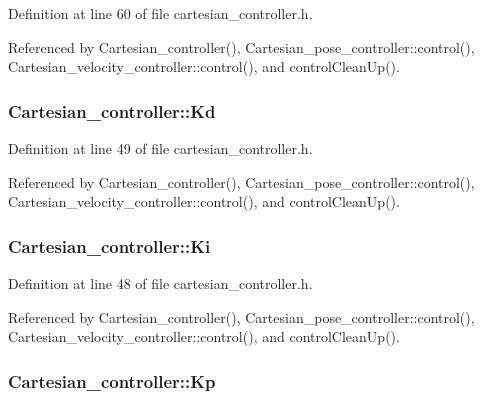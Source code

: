 Definition at line 60 of file cartesian\-\_\-controller.\-h.



Referenced by Cartesian\-\_\-controller(), Cartesian\-\_\-pose\-\_\-controller\-::control(), Cartesian\-\_\-velocity\-\_\-controller\-::control(), and control\-Clean\-Up().

\hypertarget{classCartesian__controller_a62394cef8a9a29eac18319a4ad579c4c}{
\subsubsection[{Kd}]{ Cartesian\-\_\-controller\-::\-Kd\hspace{0.3cm}{\ttfamily [protected]}}}\label{classCartesian__controller_a62394cef8a9a29eac18319a4ad579c4c}


Definition at line 49 of file cartesian\-\_\-controller.\-h.



Referenced by Cartesian\-\_\-controller(), Cartesian\-\_\-pose\-\_\-controller\-::control(), Cartesian\-\_\-velocity\-\_\-controller\-::control(), and control\-Clean\-Up().

\hypertarget{classCartesian__controller_a70e495f39da706f1b589684f58343b9e}{
\subsubsection[{Ki}]{ Cartesian\-\_\-controller\-::\-Ki\hspace{0.3cm}{\ttfamily [protected]}}}\label{classCartesian__controller_a70e495f39da706f1b589684f58343b9e}


Definition at line 48 of file cartesian\-\_\-controller.\-h.



Referenced by Cartesian\-\_\-controller(), Cartesian\-\_\-pose\-\_\-controller\-::control(), Cartesian\-\_\-velocity\-\_\-controller\-::control(), and control\-Clean\-Up().

\hypertarget{classCartesian__controller_a78073f51064a05d72c41723a93d9079f}{
\subsubsection[{Kp}]{ Cartesian\-\_\-controller\-::\-Kp\hspace{0.3cm}{\ttfamily [protected]}}}\label{classCartesian__controller_a78073f51064a05d72c41723a93d9079f}


